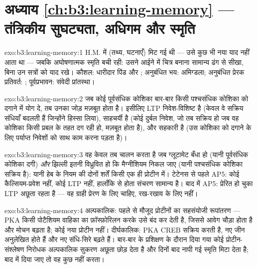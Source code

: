 \section*{अध्याय \ref{ch:b3:learning-memory} --- तंत्रिकीय सुघट्यता, अधिगम और स्मृति}

\begin{solution}{exo:b3:learning-memory:1}
H.M. में  (तथ्य, घटनाएँ) मिट गई थी --- उसे कुछ भी नया
याद नहीं आता था --- जबकि अघोषणात्मक स्मृति बची रही: उसने आईने में
चित्र बनाना सामान्य ढंग से सीखा, बिना उन सत्रों को याद रखे। कौशल:
धारीदार पिंड और ; अनुबंधित भय: अमिग्डला; अनुबंधित प्रेरक
प्रतिवर्त: ; पूर्वप्रभावन: संवेदी प्रांतस्था।
\end{solution}

\begin{solution}{exo:b3:learning-memory:2}
जब कोई पूर्वसंधिक कोशिका बार-बार किसी पश्चसंधिक कोशिका को दगाने में
योग दे, तब उनका जोड़ मज़बूत होता है। इसीलिए LTP निवेश-विशिष्ट है (केवल
वे सक्रिय संधियाँ बदलती हैं जिन्होंने हिस्सा लिया), साहचर्यी है (कोई
दुर्बल निवेश, जो तब सक्रिय हो जब वह कोशिका किसी प्रबल के तहत दग रही
हो, मज़बूत होता है), और सहकारी है (उस कोशिका को दगाने के लिए पर्याप्त
निवेशों को साथ काम करना पड़ता है)।
\end{solution}

\begin{solution}{exo:b3:learning-memory:3}
वह केवल तब चालन करता है जब ग्लूटामेट बँधा हो (यानी पूर्वसंधिक कोशिका
दगी) \emph{और} झिल्ली इतनी विध्रुवित हो कि मैग्नीशियम निकल जाए (यानी
पश्चसंधिक कोशिका सक्रिय है): यानी हेब के नियम की दोनों शर्तें किसी एक
ही प्रोटीन में। टेटेनस से पहले AP5: कोई कैल्सियम-प्रवेश नहीं, कोई LTP
नहीं, हालाँकि  से होता संचरण सामान्य है। बाद में AP5:
प्रेरित हो चुका LTP अछूता रहता है --- वह ग्राही प्रेरण के लिए चाहिए,
रख-रखाव के लिए नहीं।
\end{solution}

\begin{solution}{exo:b3:learning-memory:4}
अल्पकालिक: पहले से मौजूद प्रोटीनों का सहसंयोजी रूपांतरण --- PKA किसी
पोटैशियम वाहिका का फ़ॉस्फ़ोरिलन करके उसे बंद कर देती है, जिससे आवेग
चौड़ा होता है और मोचन बढ़ता है; कोई नया प्रोटीन नहीं। दीर्घकालिक: PKA
CREB सक्रिय करती है, नए जीन अनुलेखित होते हैं और नए संधि-सिरे बढ़ते
हैं। बार-बार के प्रशिक्षण के दौरान दिया गया कोई प्रोटीन-संश्लेषण निरोधक
अल्पकालिक सुकरण अछूता छोड़ देता है और दिनों बाद नापी गई स्मृति मिटा
देता है; बाद में दिया जाए तो वह कुछ नहीं करता।
\end{solution}

